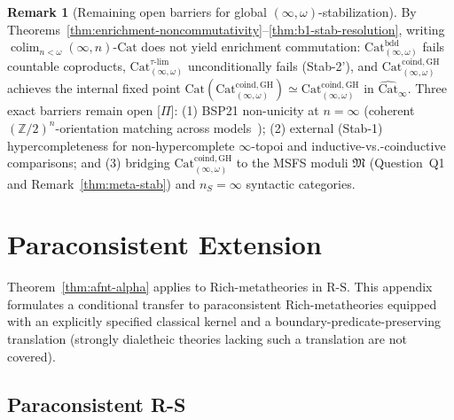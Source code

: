 \documentclass[11pt]{article}
\theoremstyle{plain}
\theoremstyle{definition}
\newtheorem{remark}[theorem]{Remark}
\newcommand{\RS}{\mathrm{R\text{-}S}}
\newcommand{\fM}{\mathfrak{M}}
\newcommand{\Cat}{\mathrm{Cat}}
\DeclareMathOperator{\colim}{colim}
\begin{document}
\begin{remark}[Remaining open barriers for global $(\infty, \omega)$-stabilization]\label{thm:bergner-lurie-stab}
By Theorems~\ref{thm:enrichment-noncommutativity}--\ref{thm:b1-stab-resolution}, writing $\colim_{n<\omega}(\infty,n)\text{-}\Cat$ does not yield enrichment commutation: $\Cat_{(\infty,\omega)}^{\mathrm{bdd}}$ fails countable coproducts, $\Cat_{(\infty,\omega)}^{\tau\text{-}\mathrm{lim}}$ unconditionally fails \textup{(Stab-2')}, and $\Cat_{(\infty,\omega)}^{\mathrm{coind, GH}}$ achieves the internal fixed point $\Cat(\Cat_{(\infty,\omega)}^{\mathrm{coind, GH}}) \simeq \Cat_{(\infty,\omega)}^{\mathrm{coind, GH}}$ in $\widehat{\Cat}_\infty$. Three exact barriers remain open \textup{[\textbf{$\Pi$}]}: (1) BSP21 non-unicity at $n = \infty$ (coherent $(\mathbb{Z}/2)^n$-orientation matching across models~\cite{BarwickSchommerPries2021}); (2) external \textup{(Stab-1)} hypercompleteness for non-hypercomplete $\infty$-topoi and inductive-vs.-coinductive comparisons; and (3) bridging $\Cat_{(\infty,\omega)}^{\mathrm{coind, GH}}$ to the MSFS moduli $\fM$ (Question~Q1 and Remark~\ref{thm:meta-stab}) and $n_S = \infty$ syntactic categories.
\end{remark}

\section{Paraconsistent Extension}\label{app:paraconsistent}

Theorem~\ref{thm:afnt-alpha} applies to Rich-metatheories in $\RS$. This appendix formulates a conditional transfer to paraconsistent Rich-metatheories equipped with an explicitly specified classical kernel and a boundary-predicate-preserving translation (strongly dialetheic theories lacking such a translation are not covered).

\subsection{Paraconsistent R-S}
\end{document}
